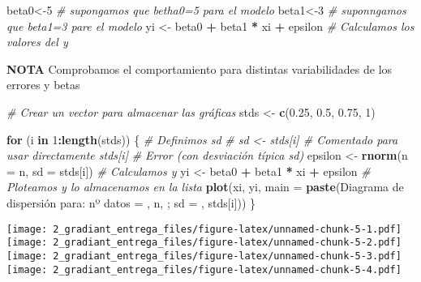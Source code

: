 \documentclass[
]{article}
\newenvironment{Shaded}{\begin{snugshade}}{\end{snugshade}}
\newcommand{\AttributeTok}[1]{\textcolor[rgb]{0.13,0.29,0.53}{#1}}
\newcommand{\CommentTok}[1]{\textcolor[rgb]{0.56,0.35,0.01}{\textit{#1}}}
\newcommand{\ControlFlowTok}[1]{\textcolor[rgb]{0.13,0.29,0.53}{\textbf{#1}}}
\newcommand{\DecValTok}[1]{\textcolor[rgb]{0.00,0.00,0.81}{#1}}
\newcommand{\FloatTok}[1]{\textcolor[rgb]{0.00,0.00,0.81}{#1}}
\newcommand{\FunctionTok}[1]{\textcolor[rgb]{0.13,0.29,0.53}{\textbf{#1}}}
\newcommand{\NormalTok}[1]{#1}
\newcommand{\OtherTok}[1]{\textcolor[rgb]{0.56,0.35,0.01}{#1}}
\newcommand{\SpecialCharTok}[1]{\textcolor[rgb]{0.81,0.36,0.00}{\textbf{#1}}}
\newcommand{\StringTok}[1]{\textcolor[rgb]{0.31,0.60,0.02}{#1}}
\begin{document}
\begin{Shaded}
\begin{Highlighting}[]
\NormalTok{beta0}\OtherTok{\textless{}{-}}\DecValTok{5} \CommentTok{\# supongamos que betha0=5 para el modelo}
\NormalTok{beta1}\OtherTok{\textless{}{-}}\DecValTok{3} \CommentTok{\# suponngamos que beta1=3 pare el modelo}
\NormalTok{yi }\OtherTok{\textless{}{-}}\NormalTok{ beta0 }\SpecialCharTok{+}\NormalTok{ beta1 }\SpecialCharTok{*}\NormalTok{ xi }\SpecialCharTok{+}\NormalTok{ epsilon  }\CommentTok{\# Calculamos los valores del  y}
\end{Highlighting}
\end{Shaded}

\textbf{NOTA} Comprobamos el comportamiento para distintas
variabilidades de los errores y betas

\begin{Shaded}
\begin{Highlighting}[]
\CommentTok{\# Crear un vector para almacenar las gráficas}
\NormalTok{stds }\OtherTok{\textless{}{-}} \FunctionTok{c}\NormalTok{(}\FloatTok{0.25}\NormalTok{, }\FloatTok{0.5}\NormalTok{, }\FloatTok{0.75}\NormalTok{, }\DecValTok{1}\NormalTok{)}

\ControlFlowTok{for}\NormalTok{ (i }\ControlFlowTok{in} \DecValTok{1}\SpecialCharTok{:}\FunctionTok{length}\NormalTok{(stds)) \{}
  \CommentTok{\# Definimos sd}
  \CommentTok{\# sd \textless{}{-} stds[i]  \# Comentado para usar directamente stds[i]}
  \CommentTok{\# Error (con desviación típica sd)}
\NormalTok{  epsilon }\OtherTok{\textless{}{-}} \FunctionTok{rnorm}\NormalTok{(}\AttributeTok{n =}\NormalTok{ n, }\AttributeTok{sd =}\NormalTok{ stds[i])}
  \CommentTok{\# Calculamos y}
\NormalTok{  yi }\OtherTok{\textless{}{-}}\NormalTok{ beta0 }\SpecialCharTok{+}\NormalTok{ beta1 }\SpecialCharTok{*}\NormalTok{ xi }\SpecialCharTok{+}\NormalTok{ epsilon}
  \CommentTok{\# Ploteamos y lo almacenamos en la lista}
  \FunctionTok{plot}\NormalTok{(xi, yi, }\AttributeTok{main =} \FunctionTok{paste}\NormalTok{(}\StringTok{\textquotesingle{}Diagrama de dispersión para: nº datos = \textquotesingle{}}\NormalTok{, n, }\StringTok{\textquotesingle{}; sd = \textquotesingle{}}\NormalTok{, stds[i]))}
\NormalTok{\}}
\end{Highlighting}
\end{Shaded}

\texttt{[image: 2\_gradiant\_entrega\_files/figure-latex/unnamed-chunk-5-1.pdf]}
\texttt{[image: 2\_gradiant\_entrega\_files/figure-latex/unnamed-chunk-5-2.pdf]}
\texttt{[image: 2\_gradiant\_entrega\_files/figure-latex/unnamed-chunk-5-3.pdf]}
\texttt{[image: 2\_gradiant\_entrega\_files/figure-latex/unnamed-chunk-5-4.pdf]}
\end{document}
